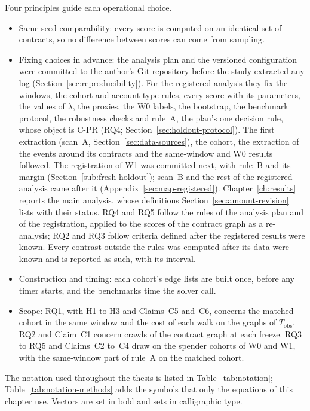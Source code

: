 Four principles guide each operational choice.
\begin{itemize}
\item Same-seed comparability: every score is computed on an identical set of contracts, so no difference between scores can come from sampling.
\item Fixing choices in advance: the analysis plan and the versioned configuration were committed to the author's Git repository before the study extracted any log (Section~\ref{sec:reproducibility}). For the registered analysis they fix the windows, the cohort and account-type rules, every score with its parameters, the values of $\lambda$, the proxies, the W0 labels, the bootstrap, the benchmark protocol, the robustness checks and rule~A, the plan's one decision rule, whose object is \mbox{C-PR} (RQ4; Section~\ref{sec:holdout-protocol}). The first extraction (scan~A, Section~\ref{sec:data-sources}), the cohort, the extraction of the events around its contracts and the same-window and W0 results followed. The registration of W1 was committed next, with rule~B and its margin (Section~\ref{sub:fresh-holdout}); scan~B and the rest of the registered analysis came after it (Appendix~\ref{sec:map-registered}). Chapter~\ref{ch:results} reports the main analysis, whose definitions Section~\ref{sec:amount-revision} lists with their status. RQ4 and RQ5 follow the rules of the analysis plan and of the registration, applied to the scores of the contract graph as a re-analysis; RQ2 and RQ3 follow criteria defined after the registered results were known. Every contrast outside the rules was computed after its data were known and is reported as such, with its interval.
\item Construction and timing: each cohort's edge lists are built once, before any timer starts, and the benchmarks time the solver call.
\item Scope: RQ1, with H1 to H3 and Claims~C5 and~C6, concerns the matched cohort in the same window and the cost of each walk on the graphs of $T_{\mathrm{obs}}$. RQ2 and Claim~C1 concern crawls of the contract graph at each freeze. RQ3 to RQ5 and Claims~C2 to~C4 draw on the spender cohorts of W0 and W1, with the same-window part of rule~A on the matched cohort.
\end{itemize}


The notation used throughout the thesis is listed in Table~\ref{tab:notation}; Table~\ref{tab:notation-methods} adds the symbols that only the equations of this chapter use. Vectors are set in bold and sets in calligraphic type.

